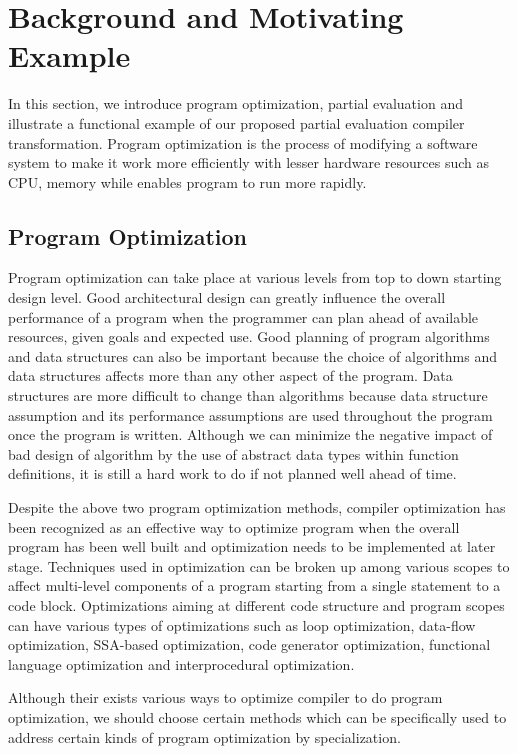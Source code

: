 \section{Background and Motivating Example}

In this section, we introduce program optimization, partial evaluation and illustrate a functional example of our proposed partial evaluation compiler transformation.
Program optimization is the process of modifying a software system to make it work more efficiently with lesser hardware resources such as CPU, memory while enables program to run more rapidly.

\subsection{Program Optimization}
Program optimization can take place at various levels from top to down starting design level. Good architectural design can greatly influence the overall performance of a program when the programmer can plan ahead of available resources, given goals and expected use.
Good planning of program algorithms and data structures can also be important because the choice of algorithms and data structures affects more than any other aspect of the program. Data structures are more difficult to change than algorithms because data structure assumption and its performance assumptions are used throughout the program once the program is written. Although we can minimize the negative impact of bad design of algorithm by the use of abstract data types within function definitions, it is still a hard work to do if not planned well ahead of time. 

Despite the above two program optimization methods, compiler optimization has been recognized as an effective way to optimize program when the overall program has been well built and optimization needs to be implemented at later stage. 
Techniques used in optimization can be broken up among various scopes to affect multi-level components of a program starting from a single statement to a code block. 
Optimizations aiming at different code structure and program scopes can have various types of optimizations such as loop optimization, data-flow optimization, SSA-based optimization, code generator optimization, functional language optimization and interprocedural optimization. 

Although their exists various ways to optimize compiler to do program optimization, we should choose certain methods which can be specifically used to address certain kinds of program optimization by specialization. 

